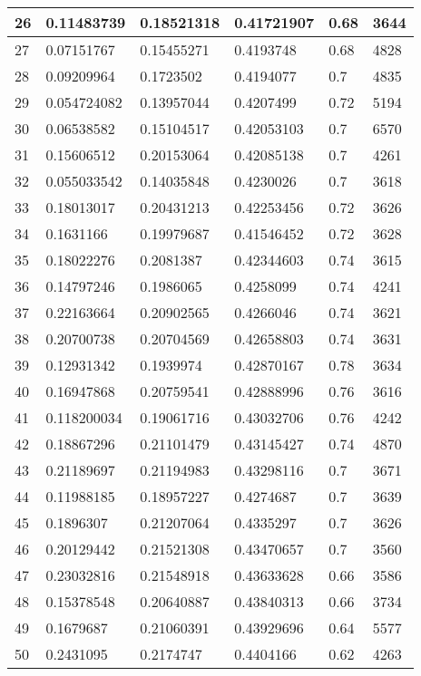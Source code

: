 \begin{longtable}{|l|l|l|l|l|l|}
26 & 0.11483739 & 0.18521318 & 0.41721907 & 0.68 & 3644 \\ \hline 
27 & 0.07151767 & 0.15455271 & 0.4193748 & 0.68 & 4828 \\ \hline 
28 & 0.09209964 & 0.1723502 & 0.4194077 & 0.7 & 4835 \\ \hline 
29 & 0.054724082 & 0.13957044 & 0.4207499 & 0.72 & 5194 \\ \hline 
30 & 0.06538582 & 0.15104517 & 0.42053103 & 0.7 & 6570 \\ \hline 
31 & 0.15606512 & 0.20153064 & 0.42085138 & 0.7 & 4261 \\ \hline 
32 & 0.055033542 & 0.14035848 & 0.4230026 & 0.7 & 3618 \\ \hline 
33 & 0.18013017 & 0.20431213 & 0.42253456 & 0.72 & 3626 \\ \hline 
34 & 0.1631166 & 0.19979687 & 0.41546452 & 0.72 & 3628 \\ \hline 
35 & 0.18022276 & 0.2081387 & 0.42344603 & 0.74 & 3615 \\ \hline 
36 & 0.14797246 & 0.1986065 & 0.4258099 & 0.74 & 4241 \\ \hline 
37 & 0.22163664 & 0.20902565 & 0.4266046 & 0.74 & 3621 \\ \hline 
38 & 0.20700738 & 0.20704569 & 0.42658803 & 0.74 & 3631 \\ \hline 
39 & 0.12931342 & 0.1939974 & 0.42870167 & 0.78 & 3634 \\ \hline 
40 & 0.16947868 & 0.20759541 & 0.42888996 & 0.76 & 3616 \\ \hline 
41 & 0.118200034 & 0.19061716 & 0.43032706 & 0.76 & 4242 \\ \hline 
42 & 0.18867296 & 0.21101479 & 0.43145427 & 0.74 & 4870 \\ \hline 
43 & 0.21189697 & 0.21194983 & 0.43298116 & 0.7 & 3671 \\ \hline 
44 & 0.11988185 & 0.18957227 & 0.4274687 & 0.7 & 3639 \\ \hline 
45 & 0.1896307 & 0.21207064 & 0.4335297 & 0.7 & 3626 \\ \hline 
46 & 0.20129442 & 0.21521308 & 0.43470657 & 0.7 & 3560 \\ \hline 
47 & 0.23032816 & 0.21548918 & 0.43633628 & 0.66 & 3586 \\ \hline 
48 & 0.15378548 & 0.20640887 & 0.43840313 & 0.66 & 3734 \\ \hline 
49 & 0.1679687 & 0.21060391 & 0.43929696 & 0.64 & 5577 \\ \hline 
50 & 0.2431095 & 0.2174747 & 0.4404166 & 0.62 & 4263 \\ \hline 
\end{longtable}